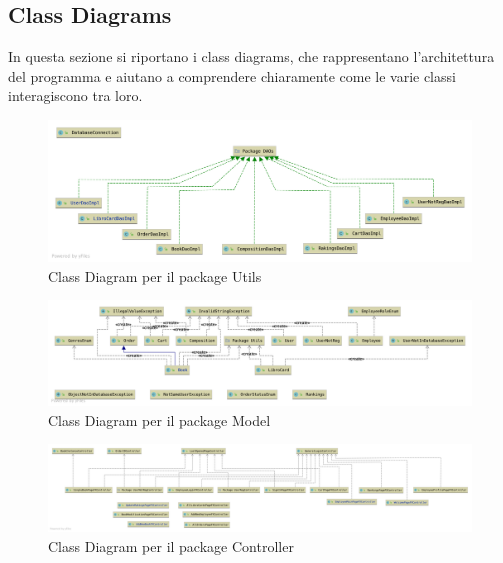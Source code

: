 \documentclass[12pt,a4paper]{article}
\begin{document}
	\subsection{Class Diagrams}
	In questa sezione si riportano i class diagrams, che rappresentano l'architettura del programma e aiutano a comprendere chiaramente come le varie classi interagiscono tra loro.\\
	\begin{figure}[h!]
		\centering
		\includegraphics[scale=0.2]{images/ClassDiagrams/UtilsClassDiagram.png}
		\caption{Class Diagram per il package Utils}
	\end{figure}
	\begin{figure}[h!]
		\centering
		\includegraphics[scale=0.2]{images/ClassDiagrams/ModelClassDiagram.png}
		\caption{Class Diagram per il package Model}
	\end{figure}
	\begin{figure}[h!]
		\centering
		\includegraphics[scale=0.13]{images/ClassDiagrams/ControllerClassDiagram.png}
		\caption{Class Diagram per il package Controller}
	\end{figure}
	\newpage
\end{document}
